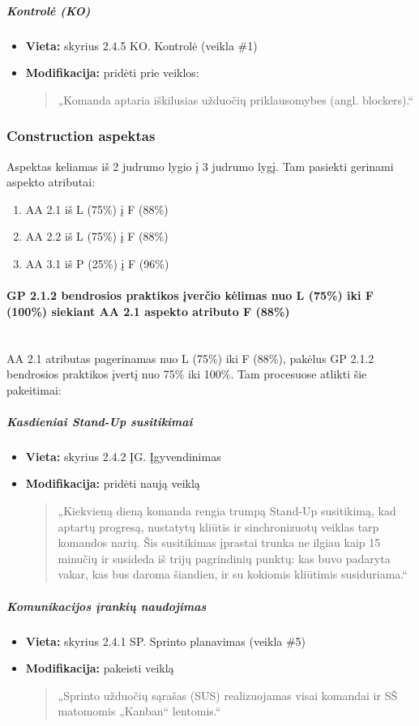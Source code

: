 \documentclass{article}
\newcommand{\subsubsubsection}[1]{\paragraph{#1}\mbox{}\\}
\begin{document}
\subparagraph{Kontrolė (KO)}
\begin{itemize}
    \item \textbf{Vieta:} skyrius 2.4.5 KO. Kontrolė (veikla \#1)
    \item \textbf{Modifikacija:} pridėti prie veiklos:
    \begin{quote}
        „Komanda aptaria iškilusias užduočių priklausomybes (angl. blockers).“
    \end{quote}
\end{itemize}

\newpage
\subsubsection{Construction aspektas}

Aspektas keliamas iš 2 judrumo lygio į 3 judrumo lygį. Tam pasiekti gerinami aspekto atributai:
\begin{enumerate}
\item AA 2.1 iš L (75\%) į F (88\%) 
\item AA 2.2 iš L (75\%) į F (88\%) 
\item AA 3.1 iš P (25\%) į F (96\%) 
\end{enumerate}

\subsubsubsection{
GP 2.1.2 bendrosios praktikos įverčio kėlimas nuo L (75\%) iki F (100\%) siekiant
AA 2.1 aspekto atributo  F (88\%)}

AA 2.1 atributas pagerinamas nuo L (75\%) iki F (88\%), pakėlus GP 2.1.2 bendrosios praktikos įvertį nuo 75\% iki 100\%. Tam procesuose atlikti šie pakeitimai: \\


\subparagraph{Kasdieniai Stand-Up susitikimai}
\begin{itemize}
    \item \textbf{Vieta:} skyrius 2.4.2 ĮG. Įgyvendinimas
    \item \textbf{Modifikacija:} pridėti naują veiklą
    \begin{quote}
    „Kiekvieną dieną komanda rengia trumpą Stand-Up susitikimą, kad aptartų progresą, nustatytų kliūtis ir sinchronizuotų veiklas tarp komandos narių. Šis susitikimas įprastai trunka ne ilgiau kaip 15 minučių ir susideda iš trijų pagrindinių punktų: kas buvo padaryta vakar, kas bus daroma šiandien, ir su kokiomis kliūtimis susiduriama.“
    \end{quote}
\end{itemize}


\subparagraph{Komunikacijos įrankių naudojimas}
\begin{itemize}
    \item \textbf{Vieta:} skyrius 2.4.1 SP. Sprinto planavimas (veikla \#5)
    \item \textbf{Modifikacija:} pakeisti veiklą 
    \begin{quote}

     „Sprinto užduočių sąrašas (SUS) realizuojamas visai komandai ir SŠ matomomis „Kanban“ lentomis.“
    \end{quote}
\end{itemize}
\end{document}
